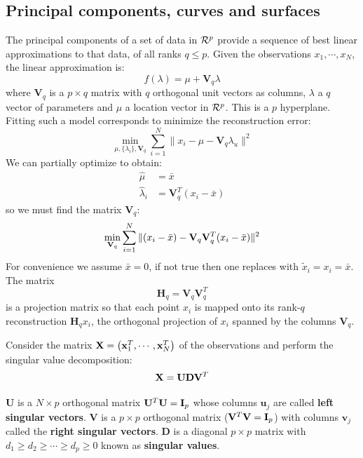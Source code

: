 \subsection{Principal components, curves and surfaces}
The principal components of a set of data in $\CMcal{R}^p$ provide a sequence of best linear approximations to that data, of all ranks $q \le p$. Given the observations $x_1, \cdots, x_N$, the linear approximation is:
\begin{equation}
f(\lambda) = \mu  + \mathbf{V}_q\lambda
\end{equation}
where $\mathbf{V}_q$ is a $p\times q$ matrix with $q$ orthogonal unit vectors as columns, $\lambda$ a $q$ vector of parameters and $\mu$ a location vector in $\CMcal{R}^p$. This is a $p$ hyperplane. Fitting such a model corresponds to minimize the reconstruction error:
\begin{equation}
\min_{\mu, \{\lambda_i\}, \mathbf{V}_q} \sum_{i=1}^N \| x_i -\mu - \mathbf{V}_q\lambda_u \|^2
\end{equation}
We can partially optimize to obtain:
\begin{equation}
\begin{aligned}
\hat{\mu} &= \bar{x}\\
\hat{\lambda}_i &= \mathbf{V}_q^T (x_i - \bar{x})
\end{aligned}
\end{equation}
so we must find the matrix $\mathbf{V}_q$:
\begin{equation}
\min_{\mathbf{V}_q} \sum_{i=1}^N  \| \br{x_i - \bar{x}} -\mathbf{V}_q\mathbf{V}_q^T\br{x_i - \bar{x}}\|^2
\end{equation}
For convenience we assume $\bar{x}=0$, if not true then one replaces with $\tilde{x}_i = x_i = \bar{x}$.
The matrix
\begin{equation}
\mathbf{H}_q = \mathbf{V}_q \mathbf{V}_q^T
\end{equation}
is a projection matrix so that each point $x_i$ is mapped onto its rank-$q$ reconstruction $\mathbf{H}_q x_i$, the orthogonal projection of $x_i$ spanned by the columns $\mathbf{V}_q$.

Consider the matrix $\mathrm{\mathbf{X}} = \left(\mathbf{x}_1^T, \cdots, \mathbf{x}_N^T\right)$ of the observations and perform the singular value decomposition:
\begin{equation}
\mathrm{\mathbf{X}} = \mathbf{U}\mathbf{D}\mathbf{V}^T
\end{equation}

$\mathbf{U}$ is a $N\times p$ orthogonal matrix $\mathbf{U}^T\mathbf{U}=\mathrm{\mathbf{I}}_p$ whose columns $\mathbf{u}_j$ are called \textbf{left singular vectors}. $\mathbf{V}$ is a $p\times p$ orthogonal matrix ($\mathbf{V}^T\mathbf{V}=\mathrm{\mathbf{I}}_p$) with columns $\mathbf{v}_j$ called the \textbf{right singular vectors}. $\mathbf{D}$ is a diagonal $p\times p$ matrix with $d_1\ge d_2\ge \cdots\ge d_p\ge 0$ known as \textbf{singular values}. 

